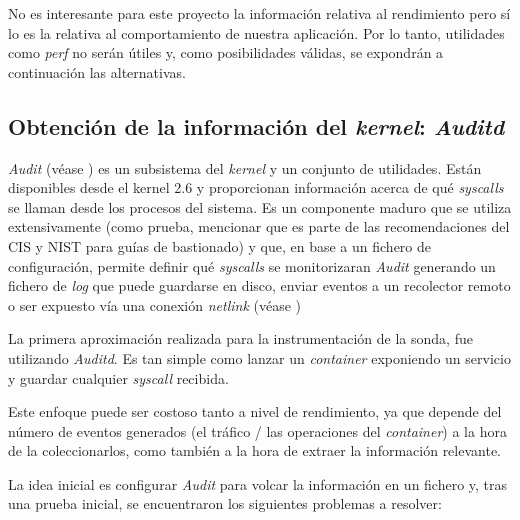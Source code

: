 No es interesante para este proyecto la información relativa al rendimiento pero sí lo es la relativa al comportamiento de nuestra aplicación. Por lo tanto,
utilidades como \emph{perf} no serán útiles y, como posibilidades válidas, se expondrán a continuación las alternativas.

\subsection{Obtención de la información del \emph{kernel}: \emph{Auditd}}
\label{subsec:auditd}

\emph{Audit} (véase \cite{redhat-auditd}) es un subsistema del \emph{kernel} y un conjunto de utilidades. 
Están disponibles desde el kernel 2.6 y proporcionan información acerca de qué \emph{syscalls}
se llaman desde los procesos del sistema. 
Es un componente maduro que se utiliza extensivamente (como prueba, mencionar que es parte de las recomendaciones del CIS y NIST para guías de bastionado)
y que, en base a un fichero de configuración, permite definir qué \emph{syscalls} se monitorizaran
\emph{Audit} generando un fichero de \emph{log} que puede guardarse en disco, enviar eventos a un recolector remoto o ser expuesto vía una conexión
\emph{netlink} (véase \cite{wiki-netlink})

La primera aproximación realizada para la instrumentación de la sonda, fue utilizando \emph{Auditd}. Es tan simple como lanzar un \emph{container} exponiendo un servicio
y guardar cualquier \emph{syscall} recibida. 

Este enfoque puede ser costoso tanto a nivel de rendimiento, ya que depende del número de eventos generados (el tráfico / las operaciones del \emph{container}) a la hora de la coleccionarlos, como también
a la hora de extraer la información relevante.

La idea inicial es configurar \emph{Audit} para volcar la información en un fichero y, tras una prueba inicial, se encuentraron los siguientes problemas a resolver:

